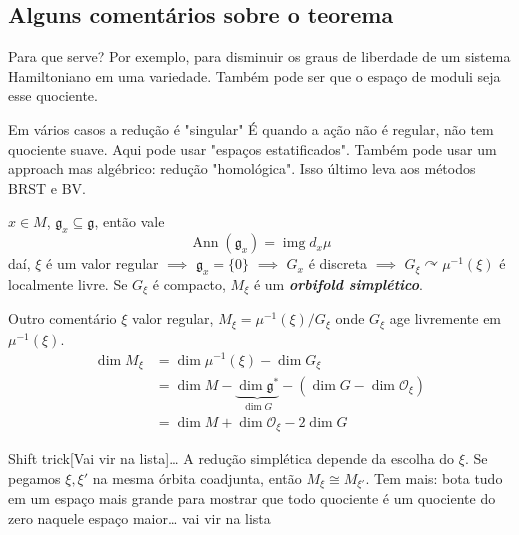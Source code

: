 \subsection{Alguns comentários sobre o teorema}

\begin{thing4}{Para que serve?}\leavevmode
Por exemplo, para disminuir os graus de liberdade de um sistema Hamiltoniano em uma variedade. Também pode ser que o espaço de moduli seja esse quociente.
\end{thing4}

\begin{thing5}{Em vários casos a redução é "singular"}\leavevmode
	É quando a ação não é regular, não tem quociente suave. Aqui pode usar "espaços estatificados". Também pode usar um approach mas algébrico: redução "homológica". Isso último leva aos métodos BRST e BV.
\end{thing5}

\begin{exercise}\leavevmode
	$x\in M$, $\mathfrak{g}_x\subseteq \mathfrak{g}$, então vale
	\[\operatorname{Ann}(\mathfrak{g}_x) =\operatorname{img} d_x\mu\]
	daí, $\xi$ é um valor regular $\implies $ $\mathfrak{g}_x=\{0\}$ $\implies $ $G_x$  é discreta $\implies $ $G_\xi\curvearrowright \mu^{-1}(\xi)$ é localmente livre. Se $G_\xi$ é compacto, $M_\xi$ é um \textit{\textbf{orbifold simplético}}.
\end{exercise}

\begin{thing1}{Outro comentário}\leavevmode
	$\xi$ valor regular, $M_\xi=\mu^{-1}(\xi)/G_\xi$ onde $G_\xi$ age livremente em $\mu^{-1}(\xi)$.
	\begin{align*}
		\dim M_\xi&=\dim \mu^{-1}(\xi)-\dim G_\xi\\
		&=\dim M-\underbrace{\dim \mathfrak{g}^*}_{\dim G}-(\dim G-\dim \mathcal{O}_\xi)\\
		&=\dim M+\dim \mathcal{O}_\xi-2\dim G
	\end{align*}
\end{thing1}


\begin{thing2}{Shift trick}[Vai vir na lista]…\leavevmode
	A redução simplética depende da escolha do $\xi$. Se pegamos $\xi,\xi'$ na mesma órbita coadjunta, então $M_\xi\cong M_{\xi'}$. Tem mais: bota tudo em um espaço mais grande para mostrar que todo quociente é um quociente do zero naquele espaço maior… vai vir na lista
\end{thing2}


